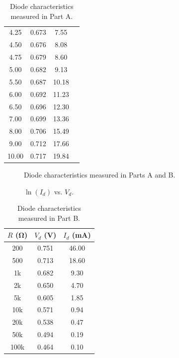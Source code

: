 \documentclass{article}
\begin{document}
\begin{table}[btph]
\begin{subtable}[t]{0.5\textwidth}
\begin{tabular}{cccc}
      4.25 & 0.673 & 7.55 \\
      4.50 & 0.676 & 8.08 \\
      4.75 & 0.679 & 8.60 \\
      5.00 & 0.682 & 9.13 \\
      5.50 & 0.687 & 10.18 \\
      6.00 & 0.692 & 11.23 \\
      6.50 & 0.696 & 12.30 \\
      7.00 & 0.699 & 13.36 \\
      8.00 & 0.706 & 15.49 \\
      9.00 & 0.712 & 17.66 \\
      10.00 & 0.717 & 19.84 \\
    \end{tabular}
  \end{subtable}
  \caption{\label{tab:part_a} Diode characteristics measured in Part A.}
\end{table}

\begin{figure}[btph]
  \centering
  
  \caption{\label{fig:combined_graph} Diode characteristics measured in Parts A and B.}
\end{figure}

\begin{figure}[hbtp]
  \centering
  
  \caption{\label{fig:part_a_graph2} $\ln{(I_d)}$ vs. $V_d$.}
\end{figure}

\begin{table}[hbtp]
  \centering
  \begin{tabular}{ccc}
    $R$ (\si{\ohm}) & $V_d$ (\si{V}) & $I_d$ (\si{mA}) \\
    \hline
    200 & 0.751 & 46.00 \\
    500 & 0.713 & 18.60 \\
    1k & 0.682 & 9.30 \\
    2k & 0.650 & 4.70 \\
    5k & 0.605 & 1.85 \\
    10k & 0.571 & 0.94 \\
    20k & 0.538 & 0.47 \\
    50k & 0.494 & 0.19 \\
    100k & 0.464 & 0.10 \\
  \end{tabular}
  \caption{\label{tab:part_b} Diode characteristics measured in Part B.}
\end{table}
\end{document}
